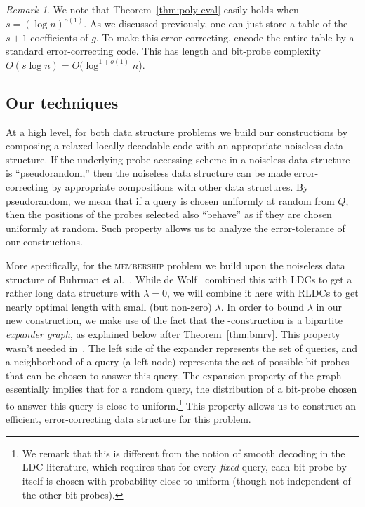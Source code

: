 \documentclass[11pt,english]{article}
\newcommand{\noun}[1]{\textsc{#1}}
\theoremstyle{definition}
\theoremstyle{remark}
\newtheorem*{rem}{Remark}
\begin{document}
\begin{rem}We note that Theorem~\ref{thm:poly eval} easily holds when
$s=(\log n)^{o(1)}$. As we discussed previously, one can just store a
table of the $s+1$ coefficients of $g$. To make this error-correcting, 
encode the entire table by a standard error-correcting code. 
This has length and bit-probe complexity $O(s\log n)=O(\log^{1+o(1)}n$).
\end{rem}

\subsection{Our techniques\label{sub:Our-technique}}

At a high level, for both data structure problems we build
our constructions by composing a relaxed locally decodable code with
an appropriate noiseless data structure. If the underlying probe-accessing
scheme in a noiseless data structure is ``pseudorandom,'' then
the noiseless data structure can be made error-correcting by appropriate
compositions with other data structures. By pseudorandom, we mean
that if a query is chosen uniformly at random from $Q$, then the positions of the probes selected
also ``behave'' as if they are chosen uniformly at random. Such
property allows us to analyze the error-tolerance of our constructions.

More specifically, for the \noun{membership} problem we build upon the noiseless data structure of Buhrman et al.~\cite{bmrv:bitvectorsj}.  While de Wolf~\cite{wolf:ecdata} combined this with LDCs to get a rather long data structure with $\lambda=0$, we will combine it here with RLDCs to get nearly optimal length with small (but non-zero) $\lambda$.  In order to bound $\lambda$ in our new construction, we make use of the fact that the \cite{bmrv:bitvectorsj}-construction is a bipartite \emph{expander graph}, as explained below after Theorem~\ref{thm:bmrv}.  This property wasn't needed in~\cite{wolf:ecdata}. The left side of the expander represents the set of queries, and a neighborhood of a query (a left node) represents the set of possible bit-probes that can be chosen to answer this query. The expansion property of the graph essentially implies that for a random query, the distribution of a bit-probe chosen to answer this query is close to uniform.\footnote{We remark that this is different from the notion of smooth decoding in the LDC literature, which requires that for every {\em fixed} query, each bit-probe by itself is chosen with probability close to uniform (though not independent of the other bit-probes).} 
This property allows us to construct an efficient, error-correcting data structure for this problem.
\end{document}
